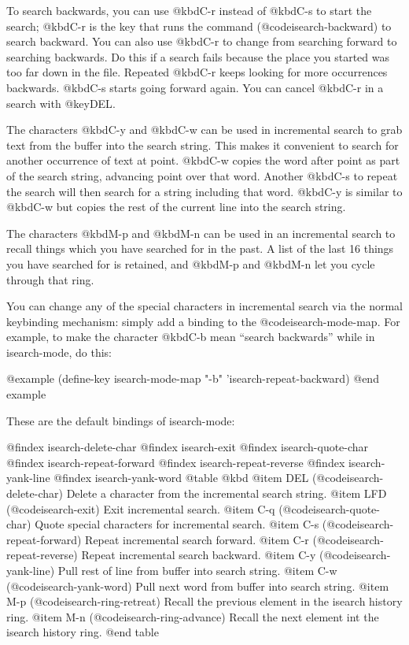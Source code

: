 {{{{ To search backwards, you can use @kbd{C-r} instead of @kbd{C-s} to
start the search; @kbd{C-r} is the key that runs the command
(@code{isearch-backward}) to search backward.  You can also use
@kbd{C-r} to change from searching forward to searching backwards.  Do
this if a search fails because the place you started was too far down in the
file.  Repeated @kbd{C-r} keeps looking for more occurrences backwards.
@kbd{C-s} starts going forward again.  You can cancel @kbd{C-r} in a
search with @key{DEL}.

  The characters @kbd{C-y} and @kbd{C-w} can be used in incremental search
to grab text from the buffer into the search string.  This makes it
convenient to search for another occurrence of text at point.  @kbd{C-w}
copies the word after point as part of the search string, advancing
point over that word.  Another @kbd{C-s} to repeat the search will then
search for a string including that word.  @kbd{C-y} is similar to @kbd{C-w}
but copies the rest of the current line into the search string.

  The characters @kbd{M-p} and @kbd{M-n} can be used in an incremental
search to recall things which you have searched for in the past.  A
list of the last 16 things you have searched for is retained, and 
@kbd{M-p} and @kbd{M-n} let you cycle through that ring.

  You can change any of the special characters in incremental search via
the normal keybinding mechanism: simply add a binding to the 
@code{isearch-mode-map}.  For example, to make the character
@kbd{C-b} mean ``search backwards'' while in isearch-mode, do this:

@example
(define-key isearch-mode-map "\C-b" 'isearch-repeat-backward)
@end example

These are the default bindings of isearch-mode:

@findex isearch-delete-char
@findex isearch-exit
@findex isearch-quote-char
@findex isearch-repeat-forward
@findex isearch-repeat-reverse
@findex isearch-yank-line
@findex isearch-yank-word
@table @kbd
@item DEL
(@code{isearch-delete-char})  Delete a character from the incremental
search string.
@item LFD
(@code{isearch-exit})  Exit incremental search.
@item C-q
(@code{isearch-quote-char})  Quote special characters for incremental
search.
@item C-s
(@code{isearch-repeat-forward})  Repeat incremental search forward.
@item C-r
(@code{isearch-repeat-reverse})  Repeat incremental search backward.
@item C-y
(@code{isearch-yank-line})  Pull rest of line from buffer into search string.
@item C-w
(@code{isearch-yank-word})  Pull next word from buffer into search
string.
@item M-p
(@code{isearch-ring-retreat})  Recall the previous element in the
isearch history ring.
@item M-n
(@code{isearch-ring-advance})  Recall the next element int the
isearch history ring.
@end table

}}}}
